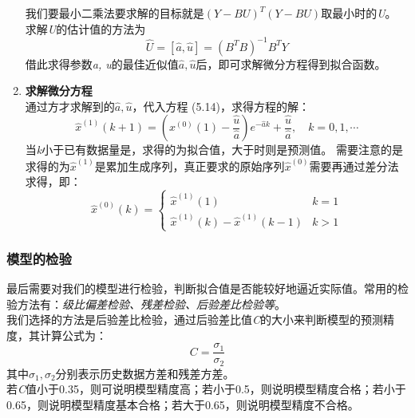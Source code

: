 \documentclass[a4paper, 12pt]{article}
\numberwithin{equation}{section}
\begin{document}
\begin{enumerate}[(1)]
                            我们要最小二乘法要求解的目标就是$ (Y - BU)^{T}(Y - BU) $取最小时的\textit{U}。
                            求解\textit{U}的估计值的方法为
                            \[ \hat{U} = [\hat{a}, \hat{u}] = (B^{T}B)^{-1}B^{T}Y \]
                            借此求得参数\textit{a, u}的最佳近似值$ \hat{a}, \hat{u} $后，即可求解微分方程得到拟合函数。


                        \item \textbf{求解微分方程} \\
                            通过方才求解到的$ \hat{a}, \hat{u} $，代入方程 (5.14)，求得方程的解：
                            \begin{equation}
                                \hat{x}^{(1)} (k + 1) = (x^{(0)}(1) - \frac{\hat{u}}{\hat{a}})e^{-\hat{a}k} + \frac{\hat{u}}{\hat{a}}, \quad k = 0, 1, \cdots
                            \end{equation}
                            当\textit{k}小于已有数据量是，求得的为拟合值，大于时则是预测值。
                            需要注意的是求得的为$ \hat{x}^{(1)} $是累加生成序列，真正要求的原始序列$ \hat{x}^{(0)} $需要再通过差分法求得，即：
                            \begin{equation}
                                \hat{x}^{(0)}(k) =
                                \begin{cases}
                                    \hat{x}^{(1)}(1) & k = 1 \\
                                    \hat{x}^{(1)}(k) - \hat{x}^{(1)}(k - 1) & k > 1
                                \end{cases}
                            \end{equation}
                    \end{enumerate}


                \subsubsection{模型的检验}
                    最后需要对我们的模型进行检验，判断拟合值是否能较好地逼近实际值。常用的检验方法有：\textit{级比偏差检验、残差检验、后验差比检验等}。\\
                    我们选择的方法是后验差比检验，通过后验差比值\textit{C}的大小来判断模型的预测精度，其计算公式为：
                    \begin{equation}
                        C = \frac{\sigma _{1}}{\sigma _{2}}
                    \end{equation}
                    其中$ \sigma _{1}, \sigma _{2} $分别表示历史数据方差和残差方差。 \\
                    若\textit{C}值小于0.35，则可说明模型精度高；若小于0.5，则说明模型精度合格；若小于0.65，则说明模型精度基本合格；若大于0.65，则说明模型精度不合格。
\end{document}
